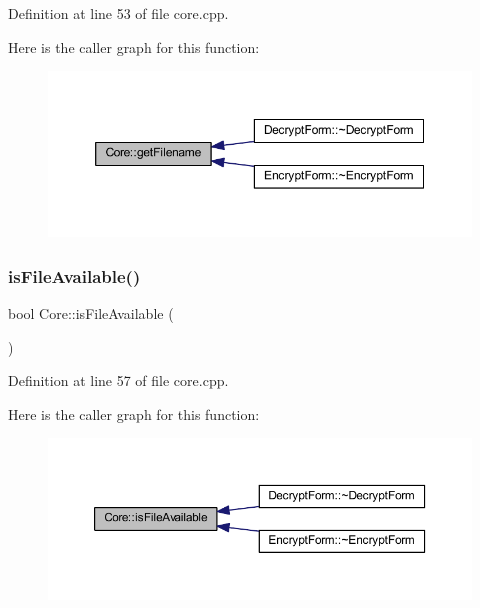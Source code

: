 Definition at line 53 of file core.\+cpp.

Here is the caller graph for this function\+:\nopagebreak
\begin{figure}[H]
\begin{center}
\leavevmode
\includegraphics[width=350pt]{class_core_aa75cf5dbf2f48a261a8596c42cf99946_icgraph}
\end{center}
\end{figure}
\hypertarget{class_core_a97c1ce83217497c5000ab5454628b7b2}{}\label{class_core_a97c1ce83217497c5000ab5454628b7b2} 
\subsubsection{\texorpdfstring{is\+File\+Available()}{isFileAvailable()}\hspace{0.1cm}{\footnotesize\ttfamily [1/2]}}
{\footnotesize\ttfamily bool Core\+::is\+File\+Available (\begin{DoxyParamCaption}{ }\end{DoxyParamCaption})}



Definition at line 57 of file core.\+cpp.

Here is the caller graph for this function\+:\nopagebreak
\begin{figure}[H]
\begin{center}
\leavevmode
\includegraphics[width=350pt]{class_core_a97c1ce83217497c5000ab5454628b7b2_icgraph}
\end{center}
\end{figure}
\hypertarget{class_core_a87e3e55dfb83db550283f160a5f9fd76}{}\label{class_core_a87e3e55dfb83db550283f160a5f9fd76} 
